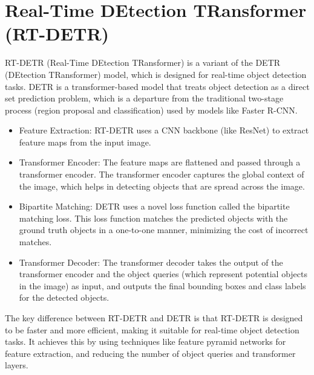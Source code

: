\section{Real-Time DEtection TRansformer (RT-DETR)}
RT-DETR (Real-Time DEtection TRansformer) is a variant of the DETR (DEtection TRansformer) model, which is designed for real-time object detection tasks. DETR is a transformer-based model that treats object detection as a direct set prediction problem, which is a departure from the traditional two-stage process (region proposal and classification) used by models like Faster R-CNN.

\begin{itemize}
  \item Feature Extraction: RT-DETR uses a CNN backbone (like ResNet) to extract feature maps from the input image.

  \item Transformer Encoder: The feature maps are flattened and passed through a transformer encoder. The transformer encoder captures the global context of the image, which helps in detecting objects that are spread across the image.

  \item Bipartite Matching: DETR uses a novel loss function called the bipartite matching loss. This loss function matches the predicted objects with the ground truth objects in a one-to-one manner, minimizing the cost of incorrect matches.

  \item Transformer Decoder: The transformer decoder takes the output of the transformer encoder and the object queries (which represent potential objects in the image) as input, and outputs the final bounding boxes and class labels for the detected objects.
\end{itemize}

The key difference between RT-DETR and DETR is that RT-DETR is designed to be faster and more efficient, making it suitable for real-time object detection tasks. It achieves this by using techniques like feature pyramid networks for feature extraction, and reducing the number of object queries and transformer layers.